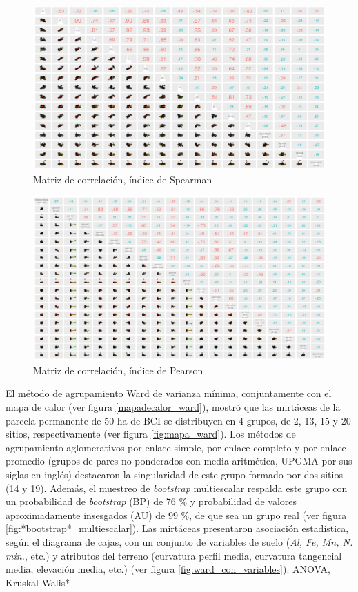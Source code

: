 \documentclass[11pt,]{article}
\begin{document}
\begin{figure}
\centering
\includegraphics{matriz_correlacion_suelo_abun_riq_spearman.png}
\caption{Matriz de correlación, índice de Spearman
\label{fig:matriz_spearman}}
\end{figure}

\begin{figure}
\centering
\includegraphics{matriz_correlacion_geomorf_abun_riq_spearman.png}
\caption{Matriz de correlación, índice de Pearson
\label{fig:matriz_pearson}}
\end{figure}

El método de agrupamiento Ward de varianza mínima, conjuntamente con el
mapa de calor (ver figura \ref{mapadecalor_ward}), mostró que las
mirtáceas de la parcela permanente de 50-ha de BCI se distribuyen en 4
grupos, de 2, 13, 15 y 20 sitios, respectivamente (ver figura
\ref{fig:mapa_ward}). Los métodos de agrupamiento aglomerativos por
enlace simple, por enlace completo y por enlace promedio (grupos de
pares no ponderados con media aritmética, UPGMA por sus siglas en
inglés) destacaron la singularidad de este grupo formado por dos sitios
(14 y 19). Además, el muestreo de \emph{bootstrap} multiescalar respalda
este grupo con un probabilidad de \emph{bootstrap} (BP) de 76 \% y
probabilidad de valores aproximadamente insesgados (AU) de 99 \%, de que
sea un grupo real (ver figura \ref {fig:*bootstrap*_multiescalar}). Las
mirtáceas presentaron asociación estadística, según el diagrama de
cajas, con un conjunto de variables de suelo (\emph{Al, Fe, Mn, N.
min.}, etc.) y atributos del terreno (curvatura perfil media, curvatura
tangencial media, elevación media, etc.) (ver figura
\ref{fig:ward_con_variables}). ANOVA, Kruskal-Walis*
\end{document}

